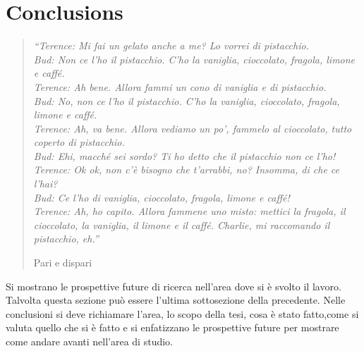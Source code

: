 \chapter{Conclusions}
\label{chapter7}
\thispagestyle{empty}

\begin{quotation}
{\footnotesize
\noindent\emph{``Terence: Mi fai un gelato anche a me? Lo vorrei di pistacchio. \\
Bud: Non ce l'ho il pistacchio. C'ho la vaniglia, cioccolato, fragola, limone e caff\'e. \\
Terence: Ah bene. Allora fammi un cono di vaniglia e di pistacchio. \\
Bud: No, non ce l'ho il pistacchio. C'ho la vaniglia, cioccolato, fragola, limone e caff\'e. \\
Terence: Ah, va bene. Allora vediamo un po', fammelo al cioccolato, tutto coperto di pistacchio. \\
Bud: Ehi, macché sei sordo? Ti ho detto che il pistacchio non ce l'ho! \\
Terence: Ok ok, non c'è bisogno che t'arrabbi, no? Insomma, di che ce l'hai? \\
Bud: Ce l'ho di vaniglia, cioccolato, fragola, limone e caff\'e! \\
Terence: Ah, ho capito. Allora fammene uno misto: mettici la fragola, il cioccolato, la vaniglia, il limone e il caff\'e. Charlie, mi raccomando il pistacchio, eh.''}
\begin{flushright}
Pari e dispari
\end{flushright}
}
\end{quotation}
\vspace{0.5cm}

\noindent Si mostrano le prospettive future di ricerca nell'area dove si \`e svolto il lavoro. Talvolta questa sezione pu\`o essere l'ultima sottosezione della precedente. Nelle conclusioni si deve richiamare l'area, lo scopo della tesi, cosa \`e stato fatto,come si valuta quello che si \`e fatto e si enfatizzano le prospettive future per mostrare come andare avanti nell'area di studio.